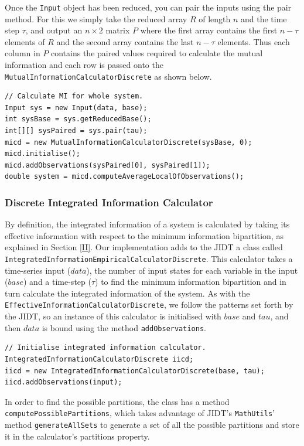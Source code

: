 \documentclass[a4paper,11pt]{article}
\begin{document}
Once the \texttt{Input} object has been reduced, you can pair the inputs using the pair method. For this we simply take the reduced array $R$ of length $n$ and the time step $\tau$, and output an $n \times 2$ matrix $P$ where the first array contains the first $n - \tau$ elements of $R$ and the second array contains the last $n - \tau$ elements. Thus each column in $P$ contains the paired values required to calculate the mutual information and each row is passed onto the \texttt{MutualInformationCalculatorDiscrete} as shown below.

\begin{verbatim}
// Calculate MI for whole system.
Input sys = new Input(data, base);
int sysBase = sys.getReducedBase();
int[][] sysPaired = sys.pair(tau);
micd = new MutualInformationCalculatorDiscrete(sysBase, 0);
micd.initialise();
micd.addObservations(sysPaired[0], sysPaired[1]);
double system = micd.computeAverageLocalOfObservations();
\end{verbatim}

\subsubsection{Discrete Integrated Information Calculator}

By definition, the integrated information of a system is calculated by taking its effective information with respect to the minimum information bipartition, as explained in Section \ref{II}. Our implementation adds to the JIDT a class called \texttt{IntegratedInformationEmpiricalCalculatorDiscrete}. This calculator takes a time-series input ($data$), the number of input states for each variable in the input ($base$) and a time-step ($\tau$) to find the minimum information bipartition and in turn calculate the integrated information of the system. As with the \texttt{EffectiveInformationCalculatorDiscrete}, we follow the patterns set forth by the JIDT, so an instance of this calculator is initialised with $base$ and $tau$, and then $data$ is bound using the method \texttt{addObservations}.

\begin{verbatim}
// Initialise integrated information calculator.
IntegratedInformationCalculatorDiscrete iicd;
iicd = new IntegratedInformationCalculatorDiscrete(base, tau);
iicd.addObservations(input);
\end{verbatim}

In order to find the possible partitions, the class has a method \texttt{computePossiblePartitions}, which takes advantage of JIDT's \texttt{MathUtils}' method \texttt{generateAllSets} to generate a set of all the possible partitions and store it in the calculator's partitions property.
\end{document}
